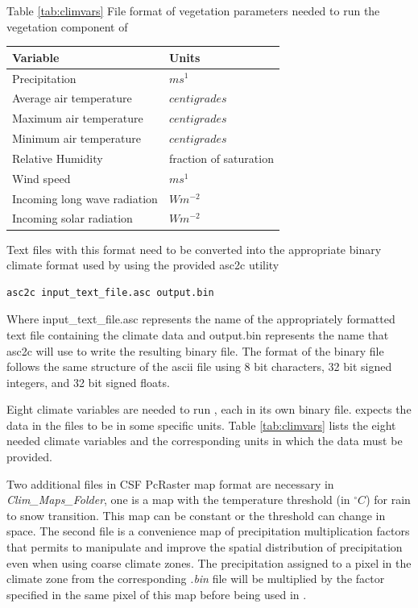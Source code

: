 \begin{center}
Table \ref{tab:climvars} File format of vegetation parameters needed to run the vegetation component of \echo
\label{tab:climvars}
\begin{longtable}{|l|l|}
\hline 
\textbf{Variable} & \textbf{Units} \\ 
\hline 
Precipitation & $ms^{1}$ \\ 
\hline 
Average air temperature & $centigrades$ \\ 
\hline 
Maximum air temperature & $centigrades$ \\ 
\hline 
Minimum air temperature & $centigrades$ \\ 
\hline 
Relative Humidity & fraction of saturation \\ 
\hline 
Wind speed & $ms^{1}$ \\ 
\hline 
Incoming long wave radiation & $Wm^{-2}$ \\ 
\hline 
Incoming solar radiation & $Wm^{-2}$ \\ 
\hline 
\end{longtable}
\end{center} 
 
Text files with this format need to be converted into the appropriate binary climate format used by \echo using the provided \textsf{asc2c} utility

\begin{verbatim}
asc2c input_text_file.asc output.bin
\end{verbatim}
 
Where \textsf{input\_text\_file.asc} represents the name of the appropriately formatted text file containing the climate data and \textsf{output.bin} represents the name that \textsf{asc2c} will use to write the resulting binary file. The format of the binary file follows the same structure of the ascii file using 8 bit characters, 32 bit signed integers, and 32 bit signed floats.

Eight climate variables are needed to run \echo, each in its own binary file. \echo expects the data in the files to be in some specific units. Table \ref{tab:climvars} lists the eight needed climate variables and the corresponding units in which the data must be provided.   

Two additional files in CSF PcRaster map format are necessary in \emph{Clim\_Maps\_Folder}, one is a map with the temperature threshold (in $^\circ C$) for rain to snow transition. This map can be constant or the threshold can change in space. The second file is a convenience map of precipitation multiplication factors that permits to manipulate and improve the spatial distribution of precipitation even when using coarse climate zones. The precipitation assigned to a pixel in the climate zone from the corresponding \textit{.bin} file will be multiplied by the factor specified in the same pixel of this map before being used in \echo. 

